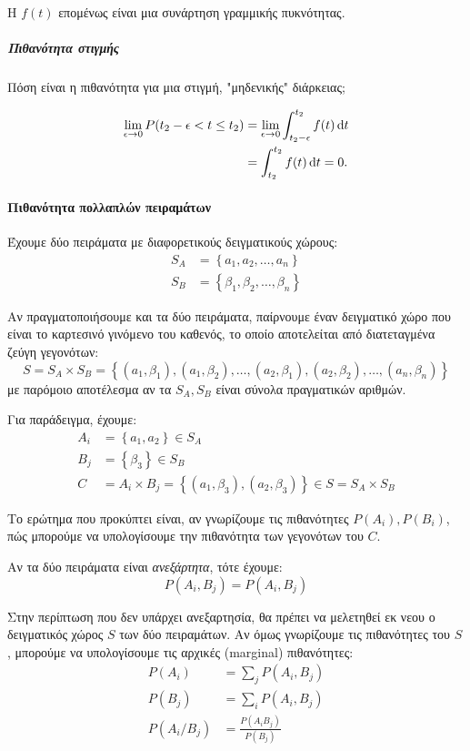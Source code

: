 \documentclass[11pt,a4paper,notitlepage,fleqn,final]{article}
\begin{document}
	Η \( f(t) \) επομένως είναι μια συνάρτηση γραμμικής πυκνότητας.
	
	\subparagraph{Πιθανότητα στιγμής}
	Πόση είναι η πιθανότητα για μια στιγμή, "μηδενικής" διάρκειας;
	
	\begin{align*}
		\lim_{\epsilon\to 0} P(t_2-\epsilon < t \leq t_2) &=
		\lim_{\epsilon\to 0} \int_{t_2-\epsilon}^{t_2} f(t)\mathop{}\!\mathrm{d} t
		\\ &= \int_{t_2}^{t_2} f(t)\mathop{}\!\mathrm{d} t = 0.
	\end{align*}
	
	\paragraph{Πιθανότητα πολλαπλών πειραμάτων}
	Έχουμε δύο πειράματα με διαφορετικούς δειγματικούς χώρους:
	\begin{align*}
		S_A &= \left\lbrace a_1,a_2,\dots,a_n \right\rbrace \\
		S_B &= \left\lbrace \beta_1,\beta_2,\dots,\beta_n \right\rbrace
	\end{align*}
	
	Αν πραγματοποιήσουμε και τα δύο πειράματα, παίρνουμε έναν δειγματικό
	χώρο που είναι το καρτεσινό γινόμενο του καθενός, το οποίο
	αποτελείται από διατεταγμένα ζεύγη γεγονότων:
	\[
	S = S_A \times S_B = \left\lbrace 
	(a_1,\beta_1),(a_1,\beta_2),\dots,(a_2,\beta_1),(a_2,\beta_2),\dots,
	(a_n,\beta_n)
	 \right\rbrace
	\]
	με παρόμοιο αποτέλεσμα αν τα \( S_A,S_B \) είναι σύνολα πραγματικών
	αριθμών.
	
	Για παράδειγμα, έχουμε:
	\begin{align*}
		A_i &= \left\lbrace a_1,a_2 \right\rbrace \in S_A \\
		B_j &= \left\lbrace \beta_3 \right\rbrace \in S_B \\
		C &= A_i \times B_j = \left\lbrace
		(a_1,\beta_3),(a_2,\beta_3) \right\rbrace \in S = S_A \times S_B
	\end{align*}
	
	Το ερώτημα που προκύπτει είναι, αν γνωρίζουμε τις πιθανότητες
	\( P(A_i), P(B_i) \), πώς μπορούμε να υπολογίσουμε την πιθανότητα
	των γεγονότων του \( C \).
	
	Αν τα δύο πειράματα είναι \textit{ανεξάρτητα}, τότε έχουμε:
	\[
	P(A_i,B_j) = P(A_i, B_j)
	\]
	
	Στην περίπτωση που δεν υπάρχει ανεξαρτησία, θα πρέπει να μελετηθεί
	εκ νεου ο δειγματικός χώρος \( S \) των δύο πειραμάτων. Αν όμως
	γνωρίζουμε τις πιθανότητες του \( S \), μπορούμε να υπολογίσουμε
	τις αρχικές (marginal) πιθανότητες:
	\begin{align*}
		P(A_i) &= \sum_j P(A_i, B_j) \\
		P(B_j) &= \sum_i P(A_i, B_j) \\
		P(A_i/B_j) &= \frac{P(A_iB_j)}{P(B_j)}
	\end{align*}
	
\end{document}

